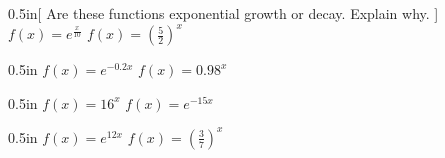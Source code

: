 \begin{my2Problems}{0.5in}[%
    Are these functions exponential growth or decay. Explain why.
]
{
    $f(x) = e^{\frac{x}{10}}$
}
{
    $f(x) = \left(\frac{5}{2}\right)^x$
}
\end{my2Problems}
\begin{my2Problems}{0.5in}
{
    $f(x) = e^{-0.2x}$
}
{
    $f(x) = 0.98^x$
}
\end{my2Problems}
\begin{my2Problems}{0.5in}
    {
        $f(x) = 16^{x}$
    }
    {
        $f(x) = e^{-15x}$
    }
\end{my2Problems}
\begin{my2Problems}{0.5in}
    {
        $f(x) = e^{12x}$
    }
    {
        $f(x) = \left(\frac{3}{7}\right)^{x}$
    }
\end{my2Problems}
       